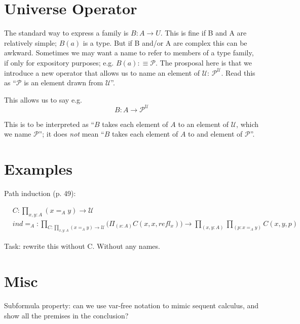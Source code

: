 \documentclass{article}
\begin{document}
\section{Universe Operator}

The standard way to express a family is \(B:A\to U\).  This is fine if
B and A are relatively simple; \(B(a)\) is a type.  But if B and/or A
are complex this can be awkward.  Sometimes we may want a name to
refer to members of a type family, if only for expository purposes;
e.g. \(B(a) :\equiv \mathcal{P}\).  The prosposal here is that we
introduce a new operator that allows us to name an element of
\(\mathcal{U}\): \(\mathcal{P}^{\mathcal{U}}\).  Read this as
``\(\mathcal{P}\) is an element drawn from \(\mathcal{U}\)''.

This allows us to say e.g. \[B:A\to \mathcal{P}^{\mathcal{U}}\]

This is to be interpreted as ``\(B\) takes each element of \(A\) to an
element of \(\mathcal{U}\), which we name \(\mathcal{P}\)''; it does
\emph{not} mean ``\(B\) takes each element of \(A\) to and element of
\(\mathcal{P}\)''.

\section{Examples}

Path induction (p. 49):

\begin{align}
  &C:\prod\limits_{x,y:A} (x =_A y) \to \mathcal{U} &\\
  &ind=_A: \prod_{C:\prod_{x,y:A}(x=_Ay)\to\mathcal{U}}\Big(\Pi_{(x:A)}C(x,x,refl_x)\Big)\to \prod_{(x,y:A)}\prod_{(p:x=_Ay)} C(x,y,p)
\end{align}

Task: rewrite this without C.  Without any names.

\section{Misc}

Subformula property: can we use var-free notation to mimic sequent calculus, and show all
the premises in the conclusion?
\end{document}
